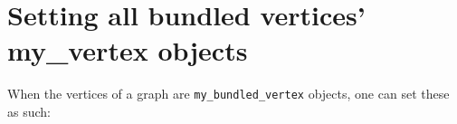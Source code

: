 

\section{Setting all bundled vertices' my\_vertex objects}
\label{subsec:set_bundled_vertex_my_vertexes}

When the vertices of a graph are \verb;my_bundled_vertex; objects, one can set
these as such:



